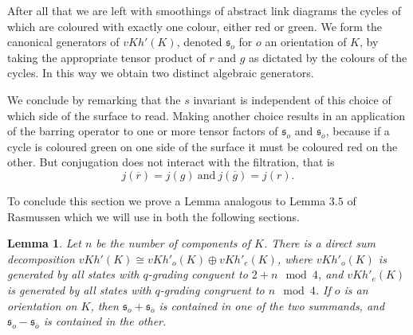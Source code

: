 \documentclass[10pt,oneside]{amsart}
\newtheorem{lemma}[theorem]{Lemma}
\theoremstyle{definition}
\numberwithin{equation}{section}
\begin{document}
After all that we are left with smoothings of abstract link diagrams the cycles of which are coloured with exactly one colour, either red or green. We form the canonical generators of \( {vKh} ' ( K ) \), denoted \( {\mathfrak{s}}_o \) for \( o \) an orientation of \( K \), by taking the appropriate tensor product of \( r \) and \( g \) as dictated by the colours of the cycles. In this way we obtain two distinct algebraic generators.

We conclude by remarking that the \( s \) invariant is independent of this choice of which side of the surface to read. Making another choice results in an application of the barring operator to one or more tensor factors of \( {\mathfrak{s}}_o \) and \( {\mathfrak{s}}_{\overline{o}} \), because if a cycle is coloured green on one side of the surface it must be coloured red on the other. But conjugation does not interact with the filtration, that is
\begin{equation*}
j(\overline{r}) = j (g)~\text{and}~j(\overline{g}) = j (r).
\end{equation*}

To conclude this section we prove a Lemma analogous to Lemma \( 3.5 \) of Rasmussen \cite{Rasmussen2010} which we will use in both the following sections.

\begin{lemma}
	\label{Lem:ras}
	Let \( n \) be the number of components of \( K \).
	There is a direct sum decomposition \( {vKh}'(K) \cong {vKh}'_o(K) \oplus
	{vKh}'_e(K) \), where \( {vKh}'_o (K) \) is generated by all states with
	\( q \)-grading conguent to \( 2+n \mod{4} \), and \( {vKh}'_e (K) \) is generated
	by all states with \( q \)-grading congruent to \( n \mod{4} \).
	If \( o \) is an orientation on \( K \), then \( {\mathfrak{s}}_o + {\mathfrak{s}}_{\overline{o}} \) is contained in one of the two
	summands, and \( {\mathfrak{s}}_o - {\mathfrak{s}}_{\overline{o}} \) is contained in the other.
\end{lemma}
\end{document}
